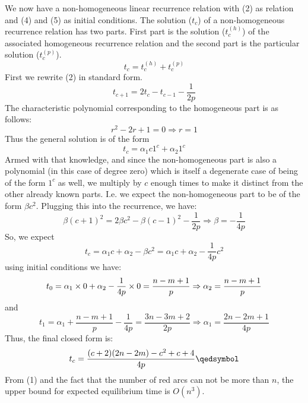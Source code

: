 \documentclass[]{book}
\theoremstyle{definition}
\begin{document}
We now have a non-homogeneous linear recurrence relation with (2) as relation and (4) and (5) as initial conditions. The solution ($t_c$)
of a non-homogeneous recurrence relation has two parts.
First part is the solution ($t^{(h)}_{c}$)
of the associated homogeneous recurrence relation and the second part is the particular solution ($t^{(p)}_{c}$).
$$
        t_c = t^{(h)}_{c} + t^{(p)}_{c}
$$
First we rewrite (2) in standard form.
\begin{equation}
    t_{c+1} = 2t_c - t_{c-1} - \frac{1}{2p}
\end{equation}
The characteristic polynomial corresponding to the homogeneous part is as follows:
$$
r^2 - 2r + 1 = 0 \Rightarrow r = 1
$$
Thus the general solution is of the form
$$
t_c = \alpha_{1}c 1^c + \alpha_{2} 1^c
$$
Armed with that knowledge, and since the non-homogeneous part is also a polynomial (in this case of degree zero) which is itself a degenerate case of being of the form $1^c$ as well, we multiply by $c$ enough times to make it distinct from the other already known parts. I.e. we expect the non-homogeneous part to be of the form $\beta c^2$. Plugging this into the recurrence, we have:
$$
\beta (c+1)^2 = 2\beta c^2 - \beta (c-1)^2 - \frac{1}{2p} \Rightarrow \beta = -\frac{1}{4p}
$$
So, we expect
$$
t_c = \alpha_1 c + \alpha_2 - \beta c^2 = \alpha_1 c + \alpha_2 -\frac{1}{4p}c^2
$$
using initial conditions we have:
$$
t_0 = \alpha_1 \times 0 + \alpha_2 - \frac{1}{4p}\times 0 = \frac{n-m+1}{p} \\
\Rightarrow \alpha_2 = \frac{n-m+1}{p}
$$
and
$$
t_1 = \alpha_1 + \frac{n-m+1}{p} -\frac{1}{4p} = \frac{3n-3m+2}{2p} \Rightarrow \alpha_1 = \frac{2n-2m+1}{4p}
$$
Thus, the final closed form is:
\begin{equation}
    t_c = \frac{(c+2)(2n-2m) - c^2 + c + 4}{4p}\\
    \qedsymbol
\end{equation}
From (1) and the fact that the number of red arcs can not be more than $n$, the upper bound for expected equilibrium time is $O(n^3)$.
\end{document}
